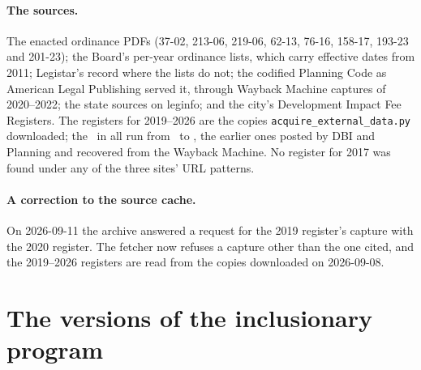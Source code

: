\documentclass[11pt]{article}
\newcommand{\extable}[1]{\FloatBarrier\def\extab{#1}}
\begin{document}
\paragraph{The sources.} The enacted ordinance PDFs (37-02, 213-06, 219-06, 62-13, 76-16,
158-17, 193-23 and 201-23); the Board's per-year ordinance lists, which carry effective dates
from 2011; Legistar's record where the lists do not; the codified Planning Code as American
Legal Publishing served it, through Wayback Machine captures of 2020--2022; the state sources on
leginfo; and the city's Development Impact Fee Registers. The registers for 2019--2026 are the
copies \texttt{acquire\_external\_data.py} downloaded; the \exRegisters\ in all run from
\exRegFirst\ to \exRegLast, the earlier ones posted by DBI and Planning and recovered from the
Wayback Machine. No register for 2017 was found under any of the three sites' URL patterns.

\paragraph{A correction to the source cache.} On 2026-09-11 the archive answered a request for
the 2019 register's capture with the 2020 register. The fetcher now refuses a capture other than
the one cited, and the 2019--2026 registers are read from the copies downloaded on 2026-09-08.

\section{The versions of the inclusionary program}\label{sec:exversions}

\extable{exversions}
\end{document}
